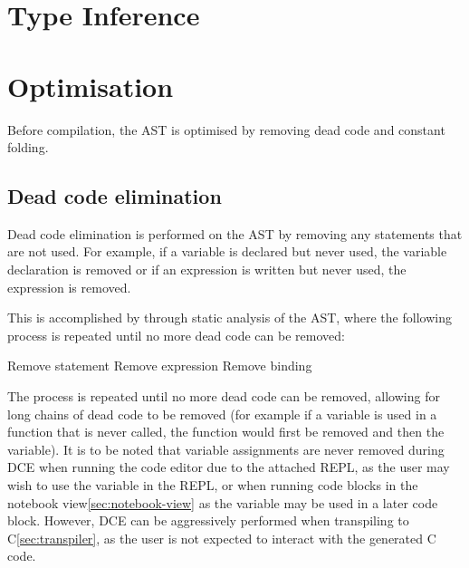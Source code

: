 \section{Type Inference}\label{sec:type-inference}


\section{Optimisation}\label{sec:optimisation}

Before compilation, the AST is optimised by removing dead code and constant folding.

\subsection{Dead code elimination}\label{subsec:dead-code-elimination}

Dead code elimination is performed on the AST by removing any statements that are not used.
For example, if a variable is declared but never used, the variable declaration is removed or if an expression is
written but never used, the expression is removed.

This is accomplished by through static analysis of the AST, where the following process is repeated until no more dead
code can be removed:

\begin{algorithmic}
                    \State Remove statement
                \EndIf
                    \State Remove expression
                \EndIf
                    \State Remove binding
                \EndIf
            \EndIf
        \EndFor
    \EndWhile
\end{algorithmic}

The process is repeated until no more dead code can be removed, allowing for long chains of dead code to be 
removed (for example if a variable is used in a function that is never called, the function would first be removed
and then the variable).
It is to be noted that variable assignments are never removed during DCE when running the code editor due to the 
attached REPL, as the user may wish to use the variable in the REPL\@, or when running code blocks in the notebook 
view\ref{sec:notebook-view} as the variable may be used in a later code block.
However, DCE can be aggressively performed when transpiling to C\ref{sec:transpiler}, as the user is not expected to 
interact with the generated C code.

